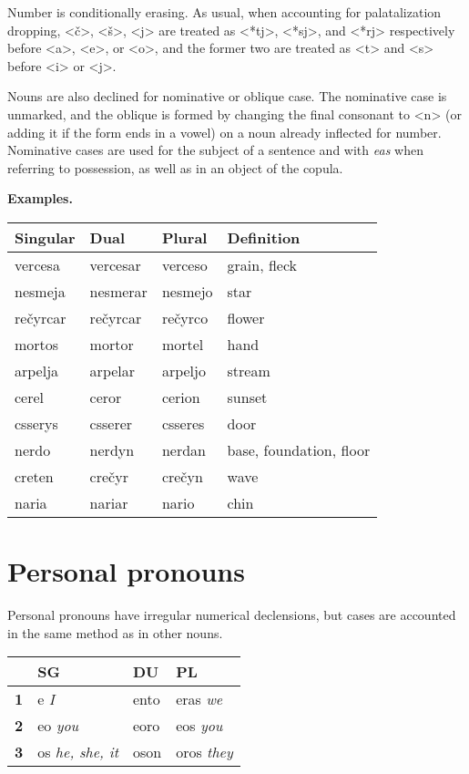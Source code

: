 \documentclass{book}
\begin{document}
Number is conditionally erasing. As usual, when accounting for palatalization dropping, <č>, <š>, <j> are treated as <*tj>, <*sj>, and <*rj> respectively before <a>, <e>, or <o>, and the former two are treated as <t> and <s> before <i> or <j>.

Nouns are also declined for nominative or oblique case. The nominative case is unmarked, and the oblique is formed by changing the final consonant to <n> (or adding it if the form ends in a vowel) on a noun already inflected for number. Nominative cases are used for the subject of a sentence and with \emph{eas} when referring to possession, as well as in an object of the copula.

\textbf{Examples.}

\begin{center}
  \begin{tabular}{|l|l|l|l|}
    \hline
    \textbf{Singular} & \textbf{Dual} & \textbf{Plural} & \textbf{Definition} \\ \hline
    vercesa & vercesar & verceso & grain, fleck \\ \hline
    nesmeja & nesmerar & nesmejo & star \\ \hline
    rečyrcar & rečyrcar & rečyrco & flower \\ \hline
    mortos & mortor & mortel & hand \\ \hline
    arpelja & arpelar & arpeljo & stream \\ \hline
    cerel & ceror & cerion & sunset \\ \hline
    csserys & csserer & csseres & door \\ \hline
    nerdo & nerdyn & nerdan & base, foundation, floor \\ \hline
    creten & crečyr & crečyn & wave \\ \hline
    naria & nariar & nario & chin \\ \hline
  \end{tabular}
\end{center}

\section{Personal pronouns}

Personal pronouns have irregular numerical declensions, but cases are accounted in the same method as in other nouns.

\begin{center}
  \begin{tabular}{|r|l|l|l|}
    \hline
    & \textbf{SG} & \textbf{DU} & \textbf{PL} \\ \hline
    \textbf{1} & e \emph{I} & ento & eras \emph{we} \\ \hline
    \textbf{2} & eo \emph{you} & eoro & eos \emph{you} \\ \hline
    \textbf{3} & os \emph{he, she, it} & oson & oros \emph{they} \\ \hline
  \end{tabular}
\end{center}
\end{document}
